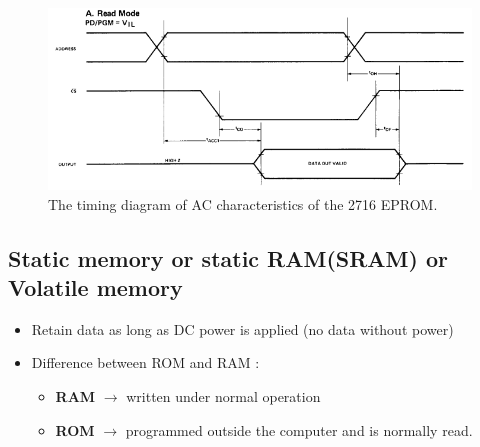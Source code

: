 \begin{figure}[h!]
  \centering
  \includegraphics[width = 1.0\textwidth]{./figures/Memory_waveform.png}
  \caption{The timing diagram of AC characteristics of the 2716 EPROM.}
  \label{}
\end{figure}

\subsection{Static memory or static RAM(SRAM) or Volatile memory}
\begin{itemize}
  \item Retain data as long as DC power is applied (no data without power)
  \item Difference between ROM and RAM :
  \begin{itemize}
    \item \textbf{RAM} $\longrightarrow$ written under normal operation
    \item \textbf{ROM} $\longrightarrow$ programmed outside the computer and is normally read.

  \end{itemize}
\end{itemize}


